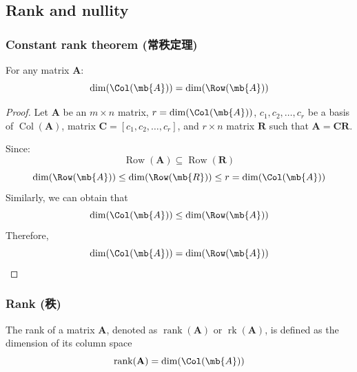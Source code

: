 \documentclass[a4paper,12pt]{report}
\begin{document}
\subsection{Rank and nullity}
\subsubsection{Constant rank theorem (常秩定理)}
For any matrix $\mathbf{A}$:
\[\dim(\Col(\mb{A}))=\dim(\Row(\mb{A}))\]
\begin{proof}
Let $\mathbf{A}$ be an $m\times n$ matrix, $r=\dim(\Col(\mb{A}))$, $ c_{1},c_{2},\ldots ,c_{r}$ be a basis of $\operatorname{Col}(\mathbf{A})$, matrix $\mathbf{C}=[c_{1},c_{2},\ldots ,c_{r}]$, and $r\times n$ matrix $\mathbf{R}$ such that $\mathbf{A}=\mathbf{C}\mathbf{R}$. 

Since:
\[\operatorname{Row}(\mathbf{A})\subseteq\operatorname{Row}(\mathbf{R})\]
\[\dim(\Row(\mb{A}))\leq\dim(\Row(\mb{R}))\leq r=\dim(\Col(\mb{A}))\]
Similarly, we can obtain that
\[\dim(\Col(\mb{A}))\leq\dim(\Row(\mb{A}))\]
Therefore,
\[\dim(\Col(\mb{A}))=\dim(\Row(\mb{A}))\]
\end{proof}
\subsubsection{Rank (秩)}
The rank of a matrix \(\mathbf{A}\), denoted as \( \operatorname{rank}(\mathbf{A}) \) or $\operatorname{rk}(\mathbf{A})$, is defined as the dimension of its column space
\[\text{rank}(\mathbf{A})=\dim(\Col(\mb{A}))\]
\end{document}
